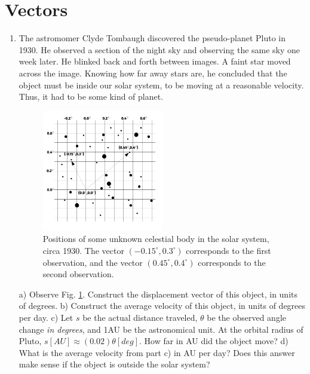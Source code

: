 \documentclass[10pt]{article}
\begin{document}
\section{Vectors}
\begin{enumerate}
\item The astromomer Clyde Tombaugh discovered the pseudo-planet Pluto in 1930.  He observed a section of the night sky and observing the same sky one week later.  He blinked back and forth between images.  A faint star moved across the image.  Knowing how far away stars are, he concluded that the object must be inside our solar system, to be moving at a reasonable velocity.  Thus, it had to be some kind of planet.
\begin{figure}
\centering
\includegraphics[width=0.5\textwidth]{PlutoDrawing.pdf}
\caption{\label{fig:1} Positions of some unknown celestial body in the solar system, circa 1930.  The vector $(-0.15^{\circ},0.3^{\circ})$ corresponds to the first observation, and the vector $(0.45^{\circ},0.4^{\circ})$ corresponds to the second observation.}
\end{figure}
a) Observe Fig. \ref{fig:1}.  Construct the displacement vector of this object, in units of degrees.  b) Construct the average velocity of this object, in units of degrees per day.  c) Let $s$ be the actual distance traveled, $\theta$ be the observed angle change \textit{in degrees}, and 1AU be the astronomical unit.  At the orbital radius of Pluto, $s[AU] \approx (0.02) \theta[deg]$.  How far in AU did the object move?  d) What is the average velocity from part c) in AU per day?  Does this answer make sense if the object is outside the solar system?
\end{enumerate}
\end{document}
